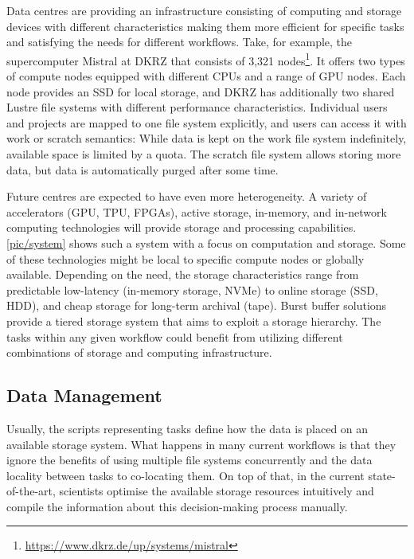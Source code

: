 \documentclass{superfri}
\begin{document}
Data centres are providing an infrastructure consisting of computing and storage devices with different characteristics making them more efficient for specific tasks and satisfying the needs for different workflows.
Take, for example, the supercomputer Mistral at DKRZ that consists of 3,321 nodes\footnote{\url{https://www.dkrz.de/up/systems/mistral}}.
It offers two types of compute nodes equipped with different CPUs and a range of GPU nodes.
Each node provides an SSD for local storage, and DKRZ has additionally two shared Lustre file systems with different performance characteristics.
Individual users and projects are mapped to one file system explicitly, and users can access it with work or scratch semantics:
While data is kept on the work file system indefinitely, available space is limited by a quota.
The scratch file system allows storing more data, but data is automatically purged after some time.

Future centres are expected to have even more heterogeneity. A variety of accelerators (GPU, TPU, FPGAs), active storage, in-memory, and in-network computing technologies will provide storage and processing capabilities.
\cref{pic/system} shows such a system with a focus on computation and storage.
Some of these technologies might be local to specific compute nodes or globally available.
Depending on the need, the storage characteristics range from predictable low-latency (in-memory storage, NVMe) to online storage (SSD, HDD), and cheap storage for long-term archival (tape).
Burst buffer solutions provide a tiered storage system that aims to exploit a storage hierarchy. %
The tasks within any given workflow could benefit from utilizing different combinations of storage and computing infrastructure.


\subsection{Data Management}
\label{sec:datamanagement}

Usually, the scripts representing tasks define how the data is placed on an available storage system.
What happens in many current workflows is that they ignore the benefits of using multiple file systems concurrently and the data locality between tasks to co-locating them.
On top of that, in the current state-of-the-art, scientists optimise the available storage resources intuitively and compile the information about this decision-making process manually.
\end{document}
